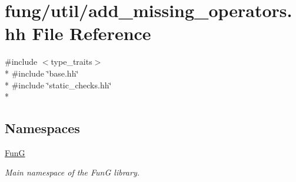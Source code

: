 \hypertarget{add__missing__operators_8hh}{}\section{fung/util/add\+\_\+missing\+\_\+operators.hh File Reference}
\label{add__missing__operators_8hh}
{\ttfamily \#include $<$type\+\_\+traits$>$}\\*
{\ttfamily \#include \char`\"{}base.\+hh\char`\"{}}\\*
{\ttfamily \#include \char`\"{}static\+\_\+checks.\+hh\char`\"{}}\\*
\subsection*{Namespaces}
\begin{DoxyCompactItemize}
\item 
 \hyperlink{namespaceFunG}{Fun\+G}
\begin{DoxyCompactList}\small\item\em Main namespace of the Fun\+G library. \end{DoxyCompactList}\end{DoxyCompactItemize}
